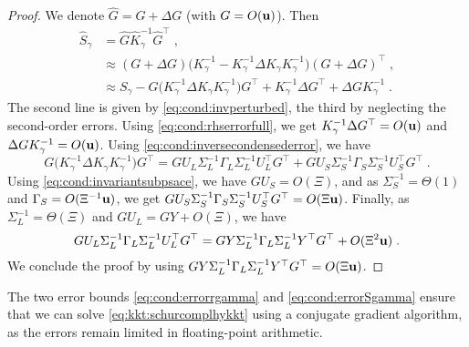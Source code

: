 \begin{proof}
  We denote $\widehat{G} = G + \Delta G$ (with $G = O(\mathbf{u})$). Then
  \begin{equation}
    \begin{aligned}
      \widehat{S}_\gamma &= \widehat{G} \widehat{K}_\gamma^{-1} \widehat{G}^\top \; , \\
                         &\approx (G + \Delta G)\big(K_\gamma^{-1} - K_\gamma^{-1}\Delta K_\gamma K_\gamma^{-1}\big)(G + \Delta G)^\top \;, \\
                    &\approx S_\gamma - G \big(K_\gamma^{-1}\Delta K_\gamma K_\gamma^{-1} \big)G^\top
                    + K_\gamma^{-1} \Delta G^\top + \Delta G K_\gamma^{-1} \; .
    \end{aligned}
  \end{equation}
  The second line is given by \eqref{eq:cond:invperturbed},
  the third by neglecting the second-order errors.
  Using \eqref{eq:cond:rhserrorfull}, we get $K_\gamma^{-1} \Delta G^\top = O(\mathbf{u})$
  and $\Delta G K_\gamma^{-1} = O(\mathbf{u})$.
  Using \eqref{eq:cond:inversecondensederror}, we have
  \begin{equation*}
    G \big(K_\gamma^{-1}\Delta K_\gamma K_\gamma^{-1} \big)G^\top =
G U_L \Sigma_L^{-1} \Gamma_L \Sigma_L^{-1}U_L^\top G^\top  +
G U_S \Sigma_S^{-1} \Gamma_S \Sigma_S^{-1}U_S^\top  G^\top \;.
  \end{equation*}
  Using \eqref{eq:cond:invariantsubpsace}, we have $G U_S = O(\Xi)$,
  and as $\Sigma_S^{-1} = \Theta(1)$ and $\Gamma_S = O(\Xi^{-1} \mathbf{u})$, we
  get
  $G U_S \Sigma_S^{-1} \Gamma_S \Sigma_S^{-1}U_S^\top  G^\top = O(\Xi \mathbf{u})$.
  Finally, as $\Sigma_L^{-1} = \Theta(\Xi)$ and $G U_L = GY + O(\Xi)$,
  we have
  \begin{equation}
    G U_L \Sigma_L^{-1} \Gamma_L \Sigma_L^{-1}U_L^\top G^\top =
    G Y \Sigma_L^{-1} \Gamma_L \Sigma_L^{-1}Y^\top G^\top + O(\Xi^2 \mathbf{u}) \; .
  \end{equation}
  We conclude the proof by using
  $G Y \Sigma_L^{-1} \Gamma_L \Sigma_L^{-1}Y^\top G^\top = O(\Xi \mathbf{u})$.
\end{proof}
The two error bounds \eqref{eq:cond:errorrgamma} and
\eqref{eq:cond:errorSgamma} ensure that we can solve
\eqref{eq:kkt:schurcomplhykkt} using a conjugate gradient
algorithm, as the errors remain limited in floating-point
arithmetic.


